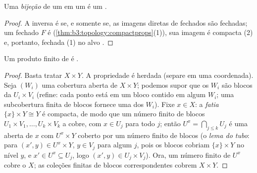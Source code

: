 \begin{corollary}\label{cor:b3:topology:compacthomeo}
Uma \emph{bijeção}  de um  em um  é um .
\end{corollary}

\begin{proof}
A inversa é  se, e somente se, as imagens diretas de fechados
são fechadas; um fechado $F$ é  (\cref{thm:b3:topology:compactprops}(1)), sua
imagem é compacta (2) e, portanto, fechada (1) no alvo .
\end{proof}

\begin{theorem}\label{thm:b3:topology:tychonoff}
Um produto finito de  é .
\end{theorem}

\begin{proof}
Basta tratar $X \times Y$. A propriedade  é herdada (separe em uma
coordenada). Seja $(W_i)$ uma cobertura aberta de $X
\times Y$; podemos
supor que os $W_i$ são blocos da  $U_i \times
V_i$ (refine: cada ponto está
em um bloco contido em algum $W_i$; uma subcobertura finita de
blocos fornece uma dos $W_i$). Fixe $x \in X$: a \emph{fatia} $\{x\}\times Y \cong Y$ é
compacta, de modo que um número finito de blocos $U_1\times V_1, \dots, U_k\times V_k$ a cobre, com
$x \in U_j$ para todo $j$; então $U^x = \bigcap_{j \leq k} U_j$ é uma  aberta de $x$
com $U^x \times Y$ coberto por um número finito de blocos (o \emph{lema do
tubo}: para $(x', y) \in U^x \times Y$, $y \in V_j$ para algum $j$, pois os
blocos cobriam $\{x\}\times Y$ no nível $y$, e $x' \in U^x \subseteq U_j$, logo $(x', y) \in U_j
\times V_j$). Ora, um
número finito de $U^x$ cobre o  $X$; as coleções finitas
de blocos correspondentes cobrem $X \times Y$.
\end{proof}

